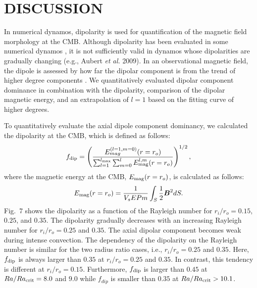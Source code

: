 \section{DISCUSSION}

In numerical dynamos, dipolarity is used for quantification of the magnetic field morphology at the CMB. 
Although dipolarity has been evaluated in some numerical dynamos \cite{Uli:2006,Soderlund:2012}, it is not sufficiently valid in dynamos whose dipolarities are gradually changing (e.g., Aubert {\it et al.} 2009). 
In an observational magnetic field, the dipole is assessed by how far the dipolar component is from the trend of higher degree components \cite{Lowes:1974,Langel:1982}. 
We quantitatively evaluated dipolar component dominance in combination with the dipolarity, comparison of the dipolar magnetic energy, and an extrapolation of $l = 1$ based on the fitting curve of higher degrees.

To quantitatively evaluate the axial dipole component dominancy, we calculated the dipolarity at the CMB, which is defined as follows:
%
\begin{equation}
f_{\rm dip} = 
\left(
\frac{E_{mag}^{(l=1,m=0)} (r=r_o)}
     {\sum_{l=1}^{l_{\rm max}}
      \sum_{m=0}^l E_{\rm mag}^{l,m} (r=r_o)}
\right)^{1/2},
\label{eq:f_dip}
\end{equation}
%
where the magnetic energy at the CMB, $E_{\rm mag} (r=r_o)$, is calculated as follows:
%
\begin{equation}
E_{\rm mag} (r=r_o) = 
  \frac{1}{V_s E Pm} \int_S \frac{1}{2} \mbox{\boldmath$B$}^2 dS.
\end{equation}
%
Fig.~7 shows the dipolarity as a function of the Rayleigh number for $r_i/r_o = 0.15$, $0.25$, and $0.35$. 
The dipolarity gradually decreases with an increasing Rayleigh number for $r_i/r_o = 0.25$ and $0.35$. 
The axial dipolar component becomes weak during intense convection. 
The dependency of the dipolarity on the Rayleigh number is similar for the two radius ratio cases, i.e., $r_i/r_o = 0.25$ and $0.35$. 
Here, $f_{\rm dip}$ is always larger than $0.35$ at $r_i/r_o = 0.25$ and $0.35$. 
In contrast, this tendency is different at $r_i/r_o = 0.15$. 
Furthermore, $f_{\rm dip}$ is larger than $0.45$ at $Ra/Ra_{\rm crit} = 8.0$ and $9.0$ while $f_{dip}$ is smaller than $0.35$ at $Ra/Ra_{\rm crit} > 10.1$.

